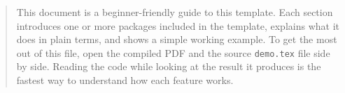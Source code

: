 
\begin{abstract}This document is a beginner-friendly guide to this template. Each section introduces one or more packages included in the template, explains what it does in plain terms, and shows a simple working example. To get the most out of this file, open the compiled PDF and the source \texttt{demo.tex} file side by side. Reading the code while looking at the result it produces is the fastest way to understand how each feature works.\end{abstract} %
\clearpage

\tableofcontents
\clearpage

\listoffigures

\listoftables

\listofalgorithms

\lstlistoflistings
\clearpage
